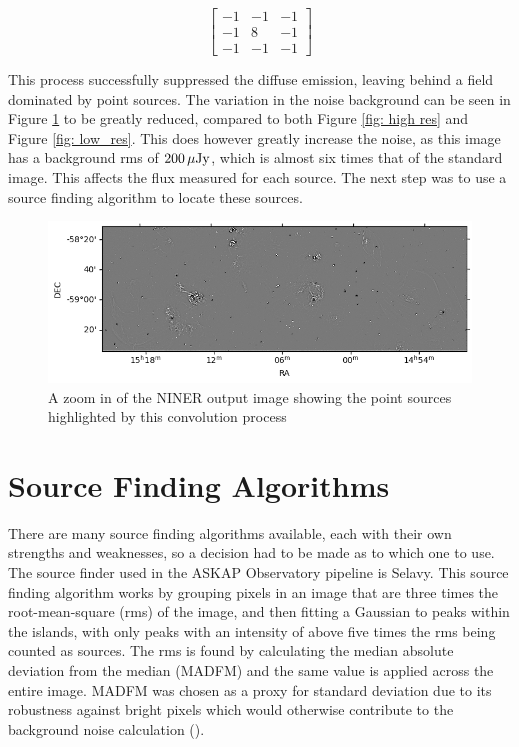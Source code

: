 \begin{equation}
    \begin{bmatrix}

    -1 & -1 & -1\\
    -1 & 8 & -1\\
    -1&-1&-1
    
    \end{bmatrix}
    \label{eq: msk2}
\end{equation}

\noindent This process successfully suppressed the diffuse emission, leaving behind a field dominated by point sources. The variation in the noise background can be seen in Figure \ref{fig: niner} to be greatly reduced, compared to both Figure \ref{fig: high res} and Figure \ref{fig: low_res}. This does however greatly increase the noise, as this image has a background rms of $200 \,\mu{\rm Jy}$, which is almost six times that of the standard image. This affects the flux measured for each source. The next step was to use a source finding algorithm to locate these sources.


\begin{figure}
    \centering
    \includegraphics[width=1\linewidth]{Thesis_Template/Figures/niner.png}
    \caption[NINER output]{A zoom in of the NINER output image showing the point sources highlighted by this convolution process}
    \label{fig: niner}
\end{figure}



\section{Source Finding Algorithms}

There are many source finding algorithms available, each with their own strengths and weaknesses, so a decision had to be made as to which one to use. The source finder used in the ASKAP Observatory pipeline is Selavy. This source finding algorithm works by grouping pixels in an image that are three times the root-mean-square (rms) of the image, and then fitting a Gaussian to peaks within the islands, with only peaks with an intensity of above five times the rms being counted as sources. The rms is found by calculating the median absolute deviation from the median (MADFM) and the same value is applied across the entire image. MADFM was chosen as a proxy for standard deviation due to its robustness against bright pixels which would otherwise contribute to the background noise calculation (\cite{Duchamp_Whiting_2012}). 

